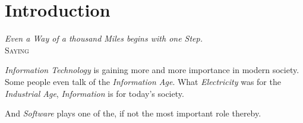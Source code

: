 %
%
%
%
%
%
%

\chapter{Introduction}
\label{introduction_heading}

\begin{flushright}
    \textsl{Even a Way of a thousand Miles begins with one Step.}\\
    \textsc{Saying}
\end{flushright}

\emph{Information Technology} is gaining more and more importance in modern
society. Some people even talk of the \emph{Information Age}. What
\emph{Electricity} was for the \emph{Industrial Age}, \emph{Information} is for
today's society.

And \emph{Software} plays one of the, if not the most important role thereby.








